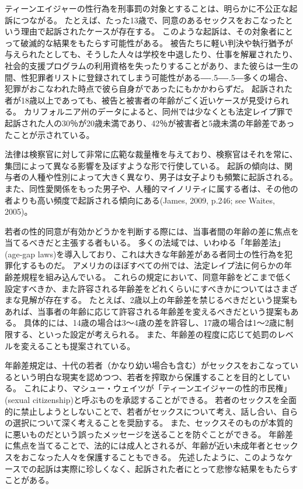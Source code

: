 \documentclass[paper=a4,book,openany]{jlreq}
\def\DDASH{―\kern-.5\zw―\kern-.5\zw―} %
\begin{document}
ティーンエイジャーの性行為を刑事罰の対象とすることは、明らかに不公正な起訴につながる。
たとえば、たった13歳で、同意のあるセックスをおこなったという理由で起訴されたケースが存在する。
このような起訴は、その対象者にとって破滅的な結果をもたらす可能性がある。
被告たちに軽い判決や執行猶予が与えられたとしても、そうした人々は学校を中退したり、仕事を解雇されたり、社会的支援プログラムの利用資格を失ったりすることがあり、また彼らは一生の間、性犯罪者リストに登録されてしまう可能性がある{\DDASH}多くの場合、犯罪がおこなわれた時点で彼ら自身がであったにもかかわらずだ。
起訴された者が18歳以上であっても、被告と被害者の年齢がごく近いケースが見受けられる。
カリフォルニア州のデータによると、同州では少なくとも法定レイプ罪で起訴された人の30％が20歳未満であり、42％が被害者と5歳未満の年齢差であったことが示されている\citep[pp.51--52]{ccasa2008}。

法律は検察官に対して非常に広範な裁量権を与えており、検察官はそれを常に、集団によって異なる影響を及ぼすような形で行使している。
起訴の傾向は、関与者の人種や性別によって大きく異なり、男子は女子よりも頻繁に起訴される。
また、同性愛関係をもった男子や、人種的マイノリティに属する者は、その他の者よりも高い頻度で起訴される傾向にある(James, 2009, p.246; see Waites, 2005)。
\nocite{james09:_romeo_juliet_were_sex_offen}\nocite{waites04:_age_consen_sexual_consen}

若者の性的同意が有効かどうかを判断する際には、当事者間の年齢の差に焦点を当てるべきだと主張する者もいる。
多くの法域では、いわゆる「年齢差法」(age-gap laws)を導入しており、これは大きな年齢差がある者同士の性行為を犯罪化するものだ。
アメリカのほぼすべての州では、法定レイプ法に何らかの年齢差規程を組み込んでいる。
これらの規定において、同意年齢をどこまで低く設定すべきか、また許容される年齢差をどれくらいにすべきかについてはさまざまな見解が存在する。
たとえば、2歳以上の年齢差を禁じるべきだという提案もあれば\citep{waites04:_age_consen_sexual_consen}、当事者の年齢に応じて許容される年齢差を変えるべきだという提案もある。
具体的には、14歳の場合は3～4歳の差を許容し、17歳の場合は1～2歳に制限する、といった設定が考えられる。
また、年齢差の程度に応じて処罰のレベルを変えることも提案されている。

年齢差規定は、十代の若者（かなり幼い場合も含む）がセックスをおこなっているという明白な現実を認めつつ、若者を搾取から保護することを目的としている。
これにより、マシュー・ウェイツが「ティーンエイジャーの性的市民権」(sexual citizenship)と呼ぶものを承認することができる。
若者のセックスを全面的に禁止しようとしないことで、若者がセックスについて考え、話し合い、自らの選択について深く考えることを奨励する。
また、セックスそのものが本質的に悪いものだという誤ったメッセージを送ることを防ぐことができる。
年齢差に焦点を当てることで、法的には成人とされるが、年齢が近い未成年者とセックスをおこなった人々を保護することもできる。
先述したように、このようなケースでの起訴は実際に珍しくなく、起訴された者にとって悲惨な結果をもたらすことがある。
\end{document}
